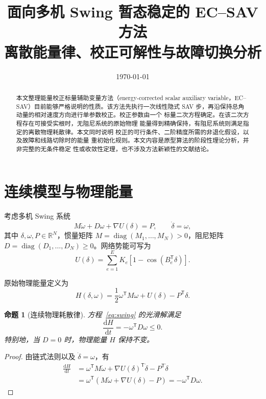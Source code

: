 \documentclass[UTF8,11pt,a4paper]{ctexart}
\title{面向多机 Swing 暂态稳定的 EC--SAV 方法\\
       \large 离散能量律、校正可解性与故障切换分析}
\author{}
\date{\today}
\newtheorem{proposition}[theorem]{命题}
\theoremstyle{definition}
\theoremstyle{remark}
\newcommand{\trans}{\mathsf{T}}
\newcommand{\R}{\mathbb{R}}
\newcommand{\dd}{\mathrm{d}}
\begin{document}
\pagestyle{plain}
\maketitle

\begin{abstract}
本文整理能量校正标量辅助变量方法（energy-corrected scalar auxiliary
variable，EC--SAV）目前能够严格说明的性质。该方法先执行一次线性隐式
SAV 步，再沿保持总角动量的相对速度方向进行单参数校正。校正参数由一个
标量二次方程确定。在该二次方程存在可接受实根时，无阻尼系统的原始物理
能量得到精确保持，有阻尼系统则满足指定的离散物理耗散律。本文同时说明
校正的可行条件、二阶精度所需的非退化假设，以及故障和线路切除时的能量
重初始化规则。本文内容是原型算法的阶段性理论分析，并非完整的无条件稳定
性或收敛性定理，也不涉及方法新颖性的文献结论。
\end{abstract}

\section{连续模型与物理能量}

考虑多机 Swing 系统
\begin{equation}
  M\dot{\omega}+D\omega+\nabla U(\delta)=P,
  \qquad
  \dot{\delta}=\omega,
  \label{eq:swing}
\end{equation}
其中
\(
  \delta,\omega,P\in\R^N
\)，惯量矩阵
\(
  M=\operatorname{diag}(M_1,\ldots,M_N)>0
\)，阻尼矩阵
\(
  D=\operatorname{diag}(D_1,\ldots,D_N)\geq 0
\)。网络势能可写为
\begin{equation}
  U(\delta)
  =\sum_{e=1}^{E}K_e
   \left[1-\cos\!\left(B_e^{\trans}\delta\right)\right].
  \label{eq:potential}
\end{equation}

原始物理能量定义为
\begin{equation}
  H(\delta,\omega)
  =\frac{1}{2}\omega^{\trans}M\omega
   +U(\delta)-P^{\trans}\delta.
  \label{eq:physical-energy}
\end{equation}

\begin{proposition}[连续物理耗散律]
方程~\eqref{eq:swing} 的光滑解满足
\begin{equation}
  \frac{\dd H}{\dd t}=-\omega^{\trans}D\omega\leq 0.
  \label{eq:continuous-dissipation}
\end{equation}
特别地，当 \(D=0\) 时，物理能量 \(H\) 保持不变。
\end{proposition}

\begin{proof}
由链式法则以及 \(\dot\delta=\omega\)，有
\begin{align*}
  \frac{\dd H}{\dd t}
  &=\omega^{\trans}M\dot\omega
    +\nabla U(\delta)^{\trans}\dot\delta
    -P^{\trans}\dot\delta \\
  &=\omega^{\trans}
    \left(M\dot\omega+\nabla U(\delta)-P\right)
   =-\omega^{\trans}D\omega.
\end{align*}
\end{proof}
\end{document}
